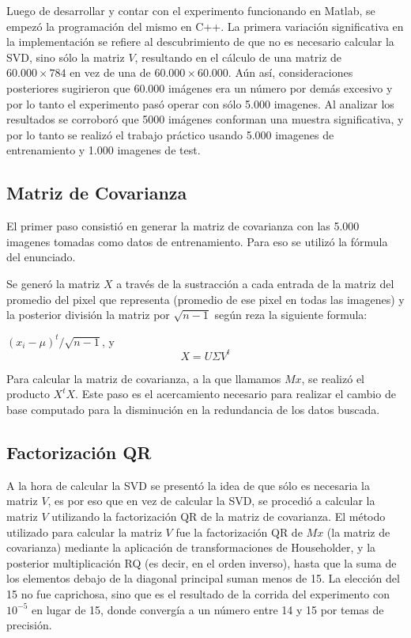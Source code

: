 Luego de desarrollar y contar con el experimento funcionando en Matlab, se empez\'o la programaci\'on
del mismo en C++. La primera variaci\'on significativa en la implementaci\'on se refiere al 
descubrimiento de que no es necesario calcular la SVD, sino s\'olo la matriz $V$, resultando 
en el c\'alculo de una matriz de $60.000 \times 784$ en vez de una de $60.000 \times 60.000$.
A\'un as\'i, consideraciones posteriores sugirieron que 60.000 im\'agenes era un n\'umero por 
dem\'as excesivo y por lo tanto el experimento pas\'o operar con s\'olo 5.000 imagenes. 
Al analizar los resultados se corrobor\'o que 5000 im\'agenes conforman una muestra significativa, 
y por lo tanto se realiz\'o el trabajo pr\'actico usando 5.000 imagenes de entrenamiento y 1.000 imagenes de test.

\subsection{Matriz de Covarianza}
El primer paso consisti\'o en generar la matriz de covarianza con las 5.000 imagenes tomadas como datos 
de entrenamiento. Para eso se utiliz\'o la f\'ormula del enunciado.

Se gener\'o la matriz $X$ a trav\'es 
de la sustracci\'on a cada entrada de la matriz del promedio del pixel que 
representa (promedio de ese pixel en todas las imagenes) y la posterior 
divisi\'on la matriz por $\sqrt{n-1}$ seg\'un reza la siguiente formula:
 
$(x_i - \mu)^{t}/\sqrt{n-1}$, y $$X=U \Sigma V^t$$

Para calcular la matriz de covarianza, a la que llamamos $Mx$, se realiz\'o el 
producto $X^tX$. Este paso es el acercamiento necesario para realizar el cambio
de base computado para la disminuci\'on en la redundancia de los datos buscada.

\subsection{Factorizaci\'on QR}
A la hora de calcular la SVD se present\'o la idea de que s\'olo es necesaria la matriz $V$, es por 
eso que en vez de calcular la SVD, se procedi\'o a calcular la matriz $V$ utilizando la factorizaci\'on 
QR de la matriz de covarianza. El m\'etodo utilizado para calcular la matriz $V$ fue la factorizaci\'on
QR de $Mx$ (la matriz de covarianza) mediante la aplicaci\'on de transformaciones de Householder, y la
posterior multiplicaci\'on RQ (es decir, en el orden inverso), hasta que la suma de los elementos debajo 
de la diagonal principal suman menos de 15. La elecci\'on del 15 no fue caprichosa, sino que es el 
resultado de la corrida del experimento con $10^{-5}$ en lugar de 15, donde converg\'ia a un n\'umero 
entre 14 y 15 por temas de precisi\'on.


